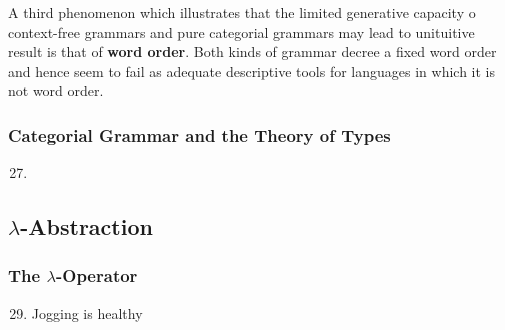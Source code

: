 \documentclass[11pt]{article}
\begin{document}
A third phenomenon which illustrates that the limited generative capacity o
context-free grammars and pure categorial grammars may lead to unituitive
result is that of \textbf{word order}. Both kinds of grammar decree a fixed word
order and hence seem to fail as adequate descriptive tools for languages in
which it is not word order.
\subsubsection{Categorial Grammar and the Theory of Types}
\label{sec:org865b745}
\begin{enumerate}
\setcounter{enumi}{26}
\item {}
\end{enumerate}
\subsection{\(λ\)-Abstraction}
\label{sec:org601423a}
\subsubsection{The \(λ\)-Operator}
\label{sec:orgf91a4ba}
\begin{enumerate}
\setcounter{enumi}{28}
\item Jogging is healthy
\end{enumerate}
\end{document}
